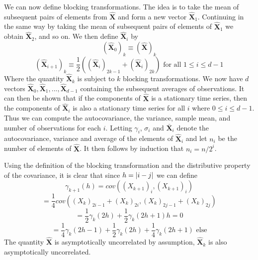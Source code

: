 \documentclass[a4paper, 10pt, english]{revtex4-2} %
\newcommand{\txt}[1]{\text{#1}}
\begin{document}
        We can now define blocking transformations. 
        The idea is to take the mean of subsequent pairs of elements from $\hat{\mathbf{X}}$ and form a new vector $\hat{\mathbf{X}}_1$.
        Continuing in the same way by taking the mean of subsequent pairs of elements of $\hat{\mathbf{X}}_1$ we obtain $\hat{\mathbf{X}}_2$, and so on.
        We then define $\hat{\mathbf{X}}_i$ by
        \begin{equation}
                (\hat{\mathbf{X}}_0)_k 
            \equiv
                (\hat{\mathbf{X}})_k
        \end{equation}
        \begin{equation}
                (\hat{\mathbf{X}}_{i+1})_k
            \equiv
                \frac{1}{2}\left((\hat{\mathbf{X}}_i)_{2k-1} + (\hat{\mathbf{X}}_i)_{2k}\right)
            \txt{  for all  }
                1 \leq i \leq d - 1
        \end{equation}
        Where the quantity $\hat{\mathbf{X}}_k$ is subject to $k$ blocking transformations. 
        We now have $d$ vectors $\hat{\mathbf{X}}_0, \hat{\mathbf{X}}_1, ..., \hat{\mathbf{X}}_{d-1}$ containing the subsequent averages of observations. 
        It can then be shown that if the components of $\hat{\mathbf{X}}$ is a stationary time series, then the components of $\hat{\mathbf{X}}_i$ is also a stationary time series for all $i$ where $0 \leq i \leq d - 1$.
        Thus we can compute the autocovariance, the variance, sample mean, and number of observations for each $i$.
        Letting $\gamma_i$, $\sigma_i$ and $\bar{\mathbf{X}}_i$ denote the autocovariance, variance and average of the elements of $\hat{\mathbf{X}}_i$ and let $n_i$ be the number of elements of $\hat{\mathbf{X}}$.
        It then follows by induction that $n_i = n/2^i$.

        Using the definition of the blocking transformation and the distributive property of the covariance, it is clear that since $h = \abs{i - j}$ we can define
        \begin{equation*}
                \gamma_{k+1}(h)
            =   cov((X_{k+1})_i, (X_{k+1})_i)
        \end{equation*}
        \begin{equation*}
            =   \frac{1}{4} cov((X_k)_{2i-1} + (X_k)_{2i}, (X_k)_{2j-1} + (X_k)_{2j})
        \end{equation*}
        \begin{equation*}
            =   \frac{1}{2}\gamma_k (2h) + \frac{1}{2}\gamma_k(2h+1)h = 0
        \end{equation*}
        \begin{equation*}
            =   \frac{1}{4}\gamma_k(2h - 1) + \frac{1}{2}\gamma_k(2h) + \frac{1}{4}\gamma_k(2h + 1)
            \txt{ else}
        \end{equation*}
        The quantity $\hat{\mathbf{X}}$ is asymptotically uncorrelated by assumption, $\hat{\mathbf{X}}_k$ is also asymptotically uncorrelated. 
        
\end{document}
